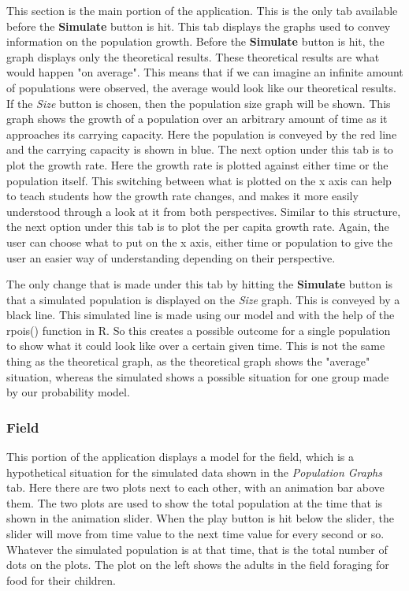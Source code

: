 \documentclass{article}\usepackage[]{graphicx}\usepackage[]{color}
\begin{document}
This section is the main portion of the application. This is the only tab available before the \textbf{Simulate} button is hit. This tab displays the graphs used to convey information on the population growth. Before the \textbf{Simulate} button is hit, the graph displays only the theoretical results. These theoretical results are what would happen "on average". This means that if we can imagine an infinite amount of populations were observed, the average would look like our theoretical results. If the \textit{Size} button is chosen, then the population size graph will be shown. This graph shows the growth of a population over an arbitrary amount of time as it approaches its carrying capacity. Here the population is conveyed by the red line and the carrying capacity is shown in blue. The next option under this tab is to plot the growth rate. Here the growth rate is plotted against either time or the population itself. This switching between what is plotted on the x axis can help to teach students how the growth rate changes, and makes it more easily understood through a look at it from both perspectives. Similar to this structure, the next option under this tab is to plot the per capita growth rate. Again, the user can choose what to put on the x axis, either time or population to give the user an easier way of understanding depending on their perspective.

The only change that is made under this tab by hitting the \textbf{Simulate} button is that a simulated population is displayed on the \textit{Size} graph. This is conveyed by a black line. This simulated line is made using our model and with the help of the rpois() function in R. So this creates a possible outcome for a single population to show what it could look like over a certain given time. This is not the same thing as the theoretical graph, as the theoretical graph shows the "average" situation, whereas the simulated shows a possible situation for one group made by our probability model. 

\subsubsection{Field}

This portion of the application displays a model for the field, which is a hypothetical situation for the simulated data shown in the \textit{Population Graphs} tab. Here there are two plots next to each other, with an animation bar above them. The two plots are used to show the total population at the time that is shown in the animation slider. When the play button is hit below the slider, the slider will move from time value to the next time value for every second or so. Whatever the simulated population is at that time, that is the total number of dots on the plots. The plot on the left shows the adults in the field foraging for food for their children. 
\end{document}
